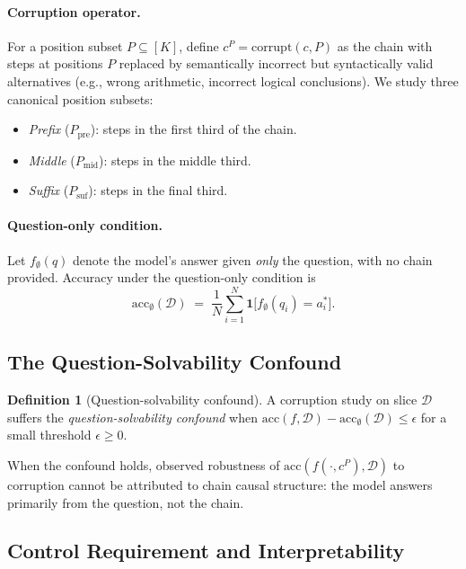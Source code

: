 \documentclass{article}
\theoremstyle{definition}
\newtheorem{definition}{Definition}
\theoremstyle{definition}
\begin{document}
\paragraph{Corruption operator.}
For a position subset $P \subseteq [K]$, define
$c^P = \mathrm{corrupt}(c, P)$ as the chain with steps at positions $P$
replaced by semantically incorrect but syntactically valid alternatives (e.g.,
wrong arithmetic, incorrect logical conclusions). We study three canonical
position subsets:
\begin{itemize}
  \item \textit{Prefix} ($P_\mathrm{pre}$): steps in the first third of the chain.
  \item \textit{Middle} ($P_\mathrm{mid}$): steps in the middle third.
  \item \textit{Suffix} ($P_\mathrm{suf}$): steps in the final third.
\end{itemize}

\paragraph{Question-only condition.}
Let $f_\emptyset(q)$ denote the model's answer given \emph{only} the question,
with no chain provided. Accuracy under the question-only condition is
\[
  \mathrm{acc}_\emptyset(\mathcal{D}) \;=\;
  \frac{1}{N}\sum_{i=1}^N \mathbf{1}\bigl[f_\emptyset(q_i) = a_i^*\bigr].
\]

\subsection{The Question-Solvability Confound}

\begin{definition}[Question-solvability confound]
  A corruption study on slice $\mathcal{D}$ suffers the
  \emph{question-solvability confound} when
  \(
    \mathrm{acc}(f,\mathcal{D}) - \mathrm{acc}_\emptyset(\mathcal{D}) \leq \epsilon
  \)
  for a small threshold $\epsilon \geq 0$.
\end{definition}

When the confound holds, observed robustness of
$\mathrm{acc}(f(\cdot, c^P), \mathcal{D})$ to corruption cannot be attributed
to chain causal structure: the model answers primarily from the question, not
the chain.

\subsection{Control Requirement and Interpretability}
\end{document}
